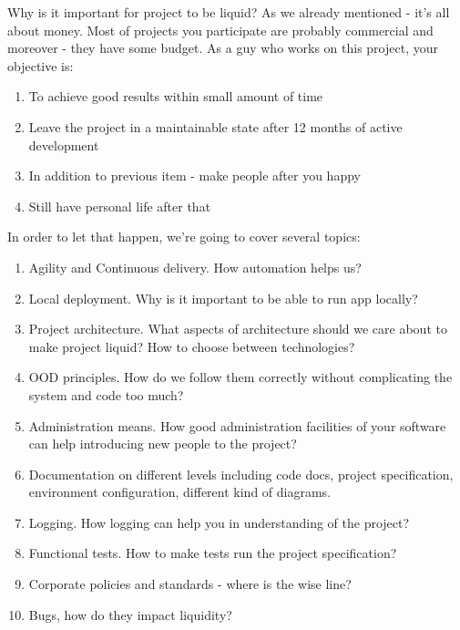 Why is it important for project to be liquid? As we already mentioned - it's all about money. Most of projects you participate are probably commercial and moreover - they have some budget. As a guy who works on this project, your objective is: 
\begin{enumerate}
 \item To achieve good results within small amount of time
 \item Leave the project in a maintainable state after 12 months of active development
 \item In addition to previous item - make people after you happy
 \item Still have personal life after that 
\end{enumerate}

In order to let that happen, we're going to cover several topics:
\begin{enumerate}
 \item Agility and Continuous delivery. How automation helps us?
 \item Local deployment. Why is it important to be able to run app locally?
 \item Project architecture. What aspects of architecture should we care about to make project liquid? How to choose between technologies?
 \item OOD principles. How do we follow them correctly without complicating the system and code too much?
 \item Administration means. How good administration facilities of your software can help introducing new people to the project?
 \item Documentation on different levels including code docs, project specification, environment configuration, different kind of diagrams.
 \item Logging. How logging can help you in understanding of the project?
 \item Functional tests. How to make tests run the project specification?
 \item Corporate policies and standards - where is the wise line?  
 \item Bugs, how do they impact liquidity?    
\end{enumerate}

